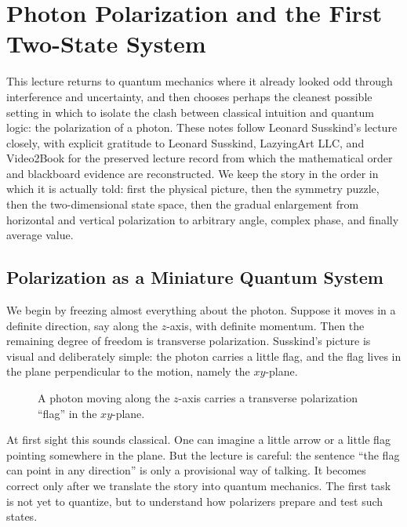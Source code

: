 \chapter{Photon Polarization and the First Two-State System}

This lecture returns to quantum mechanics where it already looked odd through interference and uncertainty, and then chooses perhaps the cleanest possible setting in which to isolate the clash between classical intuition and quantum logic: the polarization of a photon. These notes follow Leonard Susskind's lecture closely, with explicit gratitude to Leonard Susskind, LazyingArt LLC, and Video2Book for the preserved lecture record from which the mathematical order and blackboard evidence are reconstructed. We keep the story in the order in which it is actually told: first the physical picture, then the symmetry puzzle, then the two-dimensional state space, then the gradual enlargement from horizontal and vertical polarization to arbitrary angle, complex phase, and finally average value.

\section{Polarization as a Miniature Quantum System}

We begin by freezing almost everything about the photon. Suppose it moves in a definite direction, say along the \(z\)-axis, with definite momentum. Then the remaining degree of freedom is transverse polarization. Susskind's picture is visual and deliberately simple: the photon carries a little flag, and the flag lives in the plane perpendicular to the motion, namely the \(xy\)-plane.

\begin{figure}
\centering
{}
\caption{A photon moving along the \(z\)-axis carries a transverse polarization ``flag'' in the \(xy\)-plane.}
\end{figure}

At first sight this sounds classical. One can imagine a little arrow or a little flag pointing somewhere in the plane. But the lecture is careful: the sentence ``the flag can point in any direction'' is only a provisional way of talking. It becomes correct only after we translate the story into quantum mechanics. The first task is not yet to quantize, but to understand how polarizers prepare and test such states.

